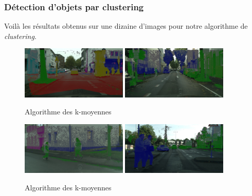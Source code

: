 \documentclass[titlepage,11pt,a4paper]{article}
\begin{document}
\subsubsection{Détection d'objets par clustering}
\par Voilà les résultats obtenus sur une dizaine d'images pour notre algorithme de \emph{clustering}.

\begin{figure}[H]
  \centering
    \includegraphics[width=0.45\textwidth]{images/result_clustering/result_0.jpg}
  \hfill{}
    \includegraphics[width=0.45\textwidth]{images/result_clustering/result_1.jpg}
  \hfill 
  \caption{Algorithme des k-moyennes}
\end{figure} 
\begin{figure}[H]
  \centering
    \includegraphics[width=0.45\textwidth]{images/result_clustering/result_2.jpg}
  \hfill{}
    \includegraphics[width=0.45\textwidth]{images/result_clustering/result_3.jpg}
  \hfill 
  \caption{Algorithme des k-moyennes}
\end{figure} 
\end{document}
